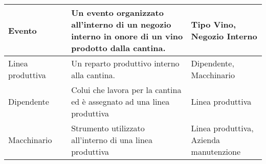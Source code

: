 \begin{center}
\begin{longtable}{P{2cm}P{2cm}P{6cm}P{4cm}}
		Evento & & Un evento organizzato all'interno di un negozio interno in onore di un vino prodotto dalla cantina. &  Tipo Vino, Negozio Interno\\

		\midrule
		Linea produttiva & & Un reparto produttivo interno alla cantina. &  Dipendente, Macchinario\\

		\midrule
		Dipendente & & Colui che lavora per la cantina ed è assegnato ad una linea produttiva &  Linea produttiva\\

		\midrule
		Macchinario & & Strumento utilizzato all'interno di una linea produttiva &  Linea produttiva, Azienda manutenzione\\
		
		\bottomrule
	\end{longtable}
\end{center}